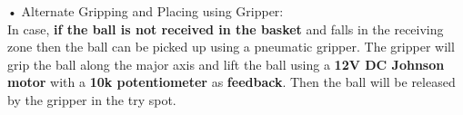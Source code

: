 \begin{minipage}[t]{\textwidth}
\begin{minipage}[t]{0.3\textwidth}
             \label{Alternate_RecievingTry_Mech}
        \end{minipage}                
    \end{minipage}        
        •  Alternate Gripping and Placing using Gripper:\\
            In case, \textbf{if the ball is not received in the basket} and falls in the receiving zone then the ball can be picked up using a pneumatic
            gripper. The gripper will grip the ball along the major axis and lift the ball using a \textbf{12V DC Johnson motor} with a \textbf{10k potentiometer}
            as \textbf{feedback}. Then the ball will be released by the gripper in the try spot.

